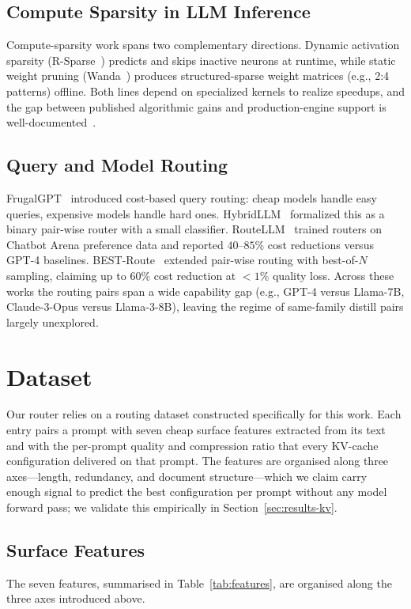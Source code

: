 \documentclass[10pt, conference]{IEEEtran}
\begin{document}
\subsection{Compute Sparsity in LLM Inference}
Compute-sparsity work spans two complementary directions. Dynamic activation sparsity (R-Sparse~\cite{wang2023rsparse}) predicts and skips inactive neurons at runtime, while static weight pruning (Wanda~\cite{sun2023wanda}) produces structured-sparse weight matrices (e.g., 2{:}4 patterns) offline. Both lines depend on specialized kernels to realize speedups, and the gap between published algorithmic gains and production-engine support is well-documented~\cite{hoefler2021sparsity, gale2019state}.

\subsection{Query and Model Routing}
FrugalGPT~\cite{chen2023frugalgpt} introduced cost-based query routing: cheap models handle easy queries, expensive models handle hard ones. HybridLLM~\cite{ding2024hybridllm} formalized this as a binary pair-wise router with a small classifier. RouteLLM~\cite{ong2024routellm} trained routers on Chatbot Arena preference data and reported $40$--$85\%$ cost reductions versus GPT-4 baselines. BEST-Route~\cite{ding2025bestroute} extended pair-wise routing with best-of-$N$ sampling, claiming up to $60\%$ cost reduction at $<1\%$ quality loss. Across these works the routing pairs span a wide capability gap (e.g., GPT-4 versus Llama-7B, Claude-3-Opus versus Llama-3-8B), leaving the regime of same-family distill pairs largely unexplored.

\section{Dataset}\label{sec:dataset}

Our router relies on a routing dataset constructed specifically for this work. Each entry pairs a prompt with seven cheap surface features extracted from its text and with the per-prompt quality and compression ratio that every KV-cache configuration delivered on that prompt. The features are organised along three axes---length, redundancy, and document structure---which we claim carry enough signal to predict the best configuration per prompt without any model forward pass; we validate this empirically in Section~\ref{sec:results-kv}.

\subsection{Surface Features}\label{sec:features}
The seven features, summarised in Table~\ref{tab:features}, are organised along the three axes introduced above.
\end{document}
